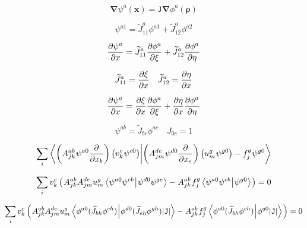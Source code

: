 \begin{equation}
   \mathbf{\nabla} \psi^{a}(\mathbf{x}) = \texttt{J} \mathbf{\nabla} \phi^{a}(\bm{\rho})
\end{equation}

\begin{equation}
   \psi^{a1} = \widetilde{J}^{a}_{11} \phi^{a1} + \widetilde{J}^{a}_{12} \phi^{a2}
\end{equation}

\begin{equation}
   \frac{\partial \psi^a}{\partial x} = \widetilde{J}^{a}_{11} \frac{\partial \phi^a}{\partial \xi} + \widetilde{J}^{a}_{12} \frac{\partial \phi^a}{\partial \eta}
\end{equation}

\begin{equation}
   \widetilde{J}^{a}_{11} = \frac{\partial \xi}{\partial x} \quad \widetilde{J}^{a}_{12} = \frac{\partial \eta}{\partial x}
\end{equation}

\begin{equation}
   \frac{\partial \psi^a}{\partial x} = \frac{\partial \xi}{\partial x} \frac{\partial \phi^a}{\partial \xi} + \frac{\partial \eta}{\partial x} \frac{\partial \phi^a}{\partial \eta}
\end{equation}

\begin{equation}
   \psi^{ab} = \widetilde{J}_{bc} \phi^{ac} \quad J_{0c} = 1
\end{equation}

\begin{equation}
   \sum_i \bra{\left(A^{ab}_{jk} \mkern1mu \psi^{a0} \frac{\partial}{\partial x_b}\right) \left(v^c_k \mkern1mu \psi^{c0}\right)}\ket{\left(A^{de}_{jm} \mkern1mu \psi^{d0} \frac{\partial}{\partial x_e}\right) \left(u^g_m \mkern1mu \psi^{g0}\right) - f^g_j \mkern1mu \psi^{g0}}
\end{equation}

\begin{equation}
   \sum_i v^c_k \left( \mkern2mu A^{ab}_{jk} A^{de}_{jm} u^g_m \bra{\psi^{a0} \psi^{cb} \mkern1mu}\ket{\mkern1mu \psi^{d0} \psi^{ge}} - \mkern1mu A^{ab}_{jk} \mkern1mu f^g_j \bra{\psi^{a0} \psi^{cb} \mkern1mu}\ket{\mkern1mu \psi^{g0}} \mkern2mu \right) = 0
\end{equation}

\begin{equation}
   \sum_i v^c_k \left( \mkern2mu A^{ab}_{jk} A^{de}_{jm} u^g_m \bra{\phi^{a0} (\widetilde{J}_{bh}  \phi^{ch}) \mkern1mu}\ket{\mkern1mu \phi^{d0} (\widetilde{J}_{eh}  \phi^{gh}) |\texttt{J}|} - \mkern1mu A^{ab}_{jk} \mkern1mu f^g_j \bra{\phi^{a0} (\widetilde{J}_{bh}  \phi^{ch}) \mkern1mu}\ket{\mkern1mu \phi^{g0} |\texttt{J}|} \mkern2mu \right) = 0
\end{equation}